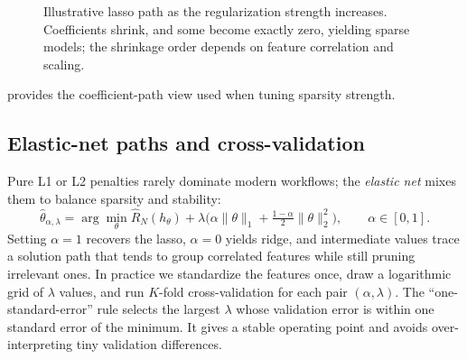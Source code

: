 \begin{figure}[!htbp]
    \centering
{}
    \caption{Illustrative lasso path as the regularization strength increases. Coefficients shrink, and some become exactly zero, yielding sparse models; the shrinkage order depends on feature correlation and scaling.}
    \label{fig:lec1_lasso_path}
\end{figure}

 provides the coefficient-path view used when tuning sparsity strength.

\subsection{Elastic-net paths and cross-validation}
\label{sec:supervised_elastic_net_paths_and_cross_validation}
Pure L1 or L2 penalties rarely dominate modern workflows; the \emph{elastic net} mixes them to balance sparsity and stability:
\begin{equation}
    \hat{\theta}_{\alpha,\lambda} = \arg\min_{\theta} \hat{R}_N(h_\theta) + \lambda\Big(\alpha \|\theta\|_1 + \tfrac{1-\alpha}{2} \|\theta\|_2^2\Big), \qquad \alpha \in [0,1].
\label{eq:elastic_net}
\end{equation}
Setting \(\alpha=1\) recovers the lasso, \(\alpha=0\) yields ridge, and intermediate values trace a solution path that tends to group correlated features while still pruning irrelevant ones. In practice we standardize the features once, draw a logarithmic grid of \(\lambda\) values, and run \(K\)-fold cross-validation for each pair \((\alpha,\lambda)\). The ``one-standard-error'' rule selects the largest \(\lambda\) whose validation error is within one standard error of the minimum. It gives a stable operating point and avoids over-interpreting tiny validation differences.


